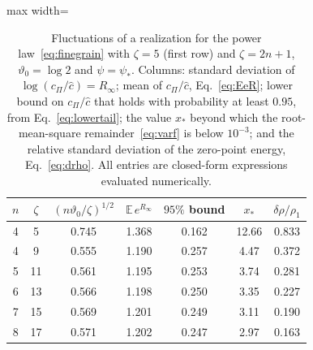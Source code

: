 \documentclass[a4paper,11pt]{article}
\newcommand{\bE}{\mathbb{E}}
\begin{document}
\begin{table}[t]
\centering
\small\begin{adjustbox}{max width=\linewidth}\begin{tabular}{ccccccc}
\hline\hline
$n$ & $\zeta$ & $(n\vartheta_0/\zeta)^{1/2}$ & $\bE\,e^{R_\infty}$ & $95\%$ bound & $x_*$ & $\delta\rho/\rho_1$\\
\hline
4 & 5 & 0.745 & 1.368 & 0.162 & 12.66 & 0.833\\
4 & 9 & 0.555 & 1.190 & 0.257 & 4.47 & 0.372\\
5 & 11 & 0.561 & 1.195 & 0.253 & 3.74 & 0.281\\
6 & 13 & 0.566 & 1.198 & 0.250 & 3.35 & 0.227\\
7 & 15 & 0.569 & 1.201 & 0.249 & 3.11 & 0.190\\
8 & 17 & 0.571 & 1.202 & 0.247 & 2.97 & 0.163\\
\hline\hline
\end{tabular}\end{adjustbox}
\caption{Fluctuations of a realization for the power law~\eqref{eq:finegrain} with $\zeta=5$ (first row) and $\zeta=2n+1$, $\vartheta_0=\log2$ and $\psi=\psi_*$. Columns: standard deviation of $\log(c_\Pi/\hat c)=R_\infty$; mean of $c_\Pi/\hat c$, Eq.~\eqref{eq:EeR}; lower bound on $c_\Pi/\hat c$ that holds with probability at least $0.95$, from Eq.~\eqref{eq:lowertail}; the value $x_*$ beyond which the root-mean-square remainder~\eqref{eq:varf} is below $10^{-3}$; and the relative standard deviation of the zero-point energy, Eq.~\eqref{eq:drho}. All entries are closed-form expressions evaluated numerically.}
\label{tab:fluct}
\end{table}
\end{document}
